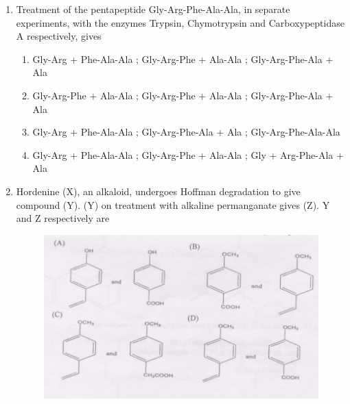 \documentclass[journal,12pt,onecolumn]{IEEEtran}
\theoremstyle{remark}
\begin{document}
\begin{enumerate}
\begin{multicols}{2}
\begin{enumerate} 
\item X-homotopic, Y-enantiotopic and Z-diastereotopic
\item X-enantiotopic, Y-homotopic and Z-diastereotopic
\item X-diastereotopic, Y-homotopic and Z-enantiotopic
\item X-homotopic, Y-diastereotopic and Z-enantiotopic
\end{enumerate}
\end{multicols}
  

\item  Treatment of the pentapeptide Gly-Arg-Phe-Ala-Ala, in separate experiments, with the enzymes Trypsin, Chymotrypsin and Carboxypeptidase A respectively, gives \hfill{}

\begin{multicols}{2}
\begin{enumerate} 
\item Gly-Arg + Phe-Ala-Ala ; Gly-Arg-Phe + Ala-Ala ; Gly-Arg-Phe-Ala + Ala
\item Gly-Arg-Phe + Ala-Ala ; Gly-Arg-Phe + Ala-Ala ; Gly-Arg-Phe-Ala + Ala
\item Gly-Arg + Phe-Ala-Ala ; Gly-Arg-Phe-Ala + Ala ; Gly-Arg-Phe-Ala-Ala
\item Gly-Arg + Phe-Ala-Ala ; Gly-Arg-Phe + Ala-Ala ; Gly + Arg-Phe-Ala + Ala
\end{enumerate}
\end{multicols}


\item  Hordenine (X), an alkaloid, undergoes Hoffman degradation to give compound (Y). (Y) on treatment with alkaline permanganate gives (Z). Y and Z respectively are \hfill{}
\begin{figure}
    \centering
    \includegraphics[width=0.5\columnwidth]{figs/image12.png}
    \caption{}
    \label{fig:figure12}
\end{figure}





\end{enumerate}
\end{document}
